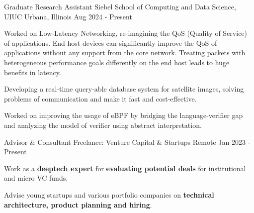

\begin{cventries}


  \cventry
    {Graduate Research Assistant} %
    {Siebel School of Computing and Data Science, UIUC} %
    {Urbana, Illinois} %
    {Aug 2024 - Present} %
    {
      \begin{cvitems} %
      \item Worked on Low-Latency Networking, re-imagining the QoS (Quality of Service) of applications. End-host devices can significantly improve the QoS of applications without any support from the core network. Treating packets with heterogeneous performance goals differently on the end host leads to huge benefits in latency.
      \item Developing a real-time query-able database system for satellite images, solving problems of communication and make it fast and cost-effective.
      \item Worked on improving the usage of eBPF by bridging the language-verifier gap and analyzing the model of verifier using abstract interpretation.
      \end{cvitems}
    }


  \cventry
    {Advisor \& Consultant} %
    {Freelance: Venture Capital \& Startups} %
    {Remote} %
    {Jan 2023 - Present} %
    {
      \begin{cvitems} %
      \item {Work as a \textbf{deeptech expert} for \textbf{evaluating potential deals} for institutional and micro VC funds.}
      \item {Advise young startups and various portfolio companies on \textbf{technical architecture, product planning and hiring}.}
      \end{cvitems}
    }


\end{cventries}
